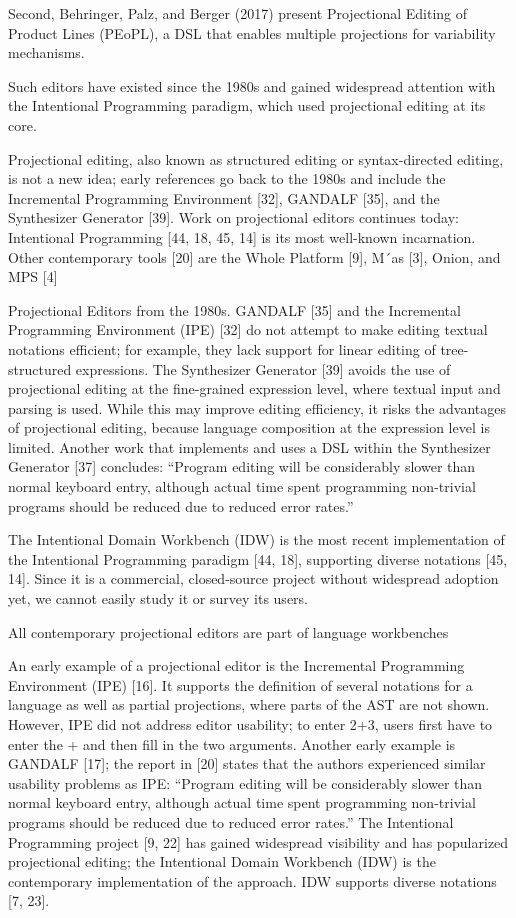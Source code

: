 Second, Behringer, Palz, and Berger (2017) present Projectional Editing of Product Lines (PEoPL), a DSL that enables multiple projections for variability mechanisms.

Such editors have existed since the 1980s and gained widespread attention with the Intentional Programming paradigm, which used projectional editing at its core.

Projectional editing, also known as structured editing or syntax-directed editing, is not a new idea; early references go back to the 1980s and include the Incremental Programming Environment [32], GANDALF [35], and the Synthesizer Generator [39].
Work on projectional editors continues today: Intentional Programming [44, 18, 45, 14] is its most well-known incarnation.
Other contemporary tools [20] are the Whole Platform [9], M´as [3], Onion, and MPS [4]

Projectional Editors from the 1980s.
GANDALF [35] and the Incremental Programming Environment (IPE) [32] do not attempt to make editing textual notations efficient; for example, they lack support for linear editing of tree-structured expressions.
The Synthesizer Generator [39] avoids the use of projectional editing at the fine-grained expression level, where textual input and parsing is used.
While this may improve editing efficiency, it risks the advantages of projectional editing, because language composition at the expression level is limited.
Another work that implements and uses a DSL within the Synthesizer Generator [37] concludes: “Program editing will be considerably slower than normal keyboard entry, although actual time spent programming non-trivial programs should be reduced due to reduced error rates.”

The Intentional Domain Workbench (IDW) is the most recent implementation of the Intentional Programming paradigm [44, 18], supporting diverse notations [45, 14].
Since it is a commercial, closed-source project without widespread adoption yet, we cannot easily study it or survey its users.


All contemporary projectional editors are part of language workbenches

An early example of a projectional editor is the Incremental Programming Environment (IPE) [16].
It supports the definition of several notations for a language as well as partial projections, where parts of the AST are not shown.
However, IPE did not address editor usability; to enter 2+3, users first have to enter the + and then fill in the two arguments.
Another early example is GANDALF [17]; the report in [20] states that the authors experienced similar usability problems as IPE: “Program editing will be considerably slower than normal keyboard entry, although actual time spent programming non-trivial programs should be reduced due to reduced error rates.”
The Intentional Programming project [9, 22] has gained widespread visibility and has popularized projectional editing; the Intentional Domain Workbench (IDW) is the contemporary implementation of the approach.
IDW supports diverse notations [7, 23].

